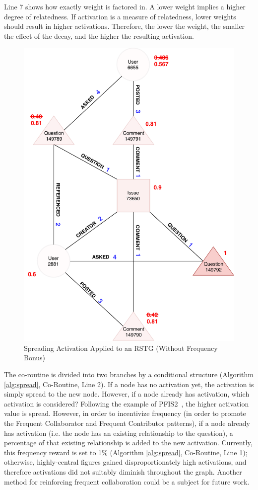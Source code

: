 \documentclass[conference]{IEEEtran}
\begin{document}
Line 7 shows how exactly weight is factored in. A lower weight implies a higher degree of relatedness. If activation is a measure of relatedness, lower weights should result in higher activations. Therefore, the lower the weight, the smaller the effect of the decay, and the higher the resulting activation.

\begin{figure}[ht]
	\centering
	\includegraphics[width=0.85\linewidth]{img/RSTG-SA.pdf}
	\caption{Spreading Activation Applied to an RSTG (Without Frequency Bonus)}
	\label{fig:rstg-sa}
\end{figure}



The co-routine is divided into two branches by a conditional structure (Algorithm \ref{alg:spread}, Co-Routine, Line 2). If a node has no activation yet, the activation is simply spread to the new node. However, if a node already has activation, which activation is considered? Following the example of PFIS2~\cite{pfis2}, the higher activation value is spread. However, in order to incentivize frequency (in order to promote the Frequent Collaborator and Frequent Contributor patterns), if a node already has activation (i.e. the node has an existing relationship to the question), a percentage of that existing relationship is added to the new activation. Currently, this frequency reward is set to 1\% (Algorithm \ref{alg:spread}, Co-Routine, Line 1); otherwise, highly-central figures gained disproportionately high activations, and therefore activations did not suitably diminish throughout the graph. Another method for reinforcing frequent collaboration could be a subject for future work.
\end{document}
